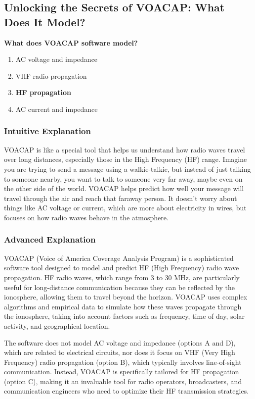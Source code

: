 \subsection{Unlocking the Secrets of VOACAP: What Does It Model?}

\begin{tcolorbox}[colback=gray!10!white,colframe=black!75!black,title=\textbf{E3C11}]
\textbf{What does VOACAP software model?}
\begin{enumerate}[label=\Alph*.]
    \item AC voltage and impedance
    \item VHF radio propagation
    \item \textbf{HF propagation}
    \item AC current and impedance
\end{enumerate}
\end{tcolorbox}

\subsubsection{Intuitive Explanation}
VOACAP is like a special tool that helps us understand how radio waves travel over long distances, especially those in the High Frequency (HF) range. Imagine you are trying to send a message using a walkie-talkie, but instead of just talking to someone nearby, you want to talk to someone very far away, maybe even on the other side of the world. VOACAP helps predict how well your message will travel through the air and reach that faraway person. It doesn't worry about things like AC voltage or current, which are more about electricity in wires, but focuses on how radio waves behave in the atmosphere.

\subsubsection{Advanced Explanation}
VOACAP (Voice of America Coverage Analysis Program) is a sophisticated software tool designed to model and predict HF (High Frequency) radio wave propagation. HF radio waves, which range from 3 to 30 MHz, are particularly useful for long-distance communication because they can be reflected by the ionosphere, allowing them to travel beyond the horizon. VOACAP uses complex algorithms and empirical data to simulate how these waves propagate through the ionosphere, taking into account factors such as frequency, time of day, solar activity, and geographical location.

The software does not model AC voltage and impedance (options A and D), which are related to electrical circuits, nor does it focus on VHF (Very High Frequency) radio propagation (option B), which typically involves line-of-sight communication. Instead, VOACAP is specifically tailored for HF propagation (option C), making it an invaluable tool for radio operators, broadcasters, and communication engineers who need to optimize their HF transmission strategies.

